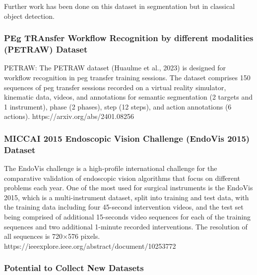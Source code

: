 Further work has been done on this dataset in segmentation \cite{lou_min-max_2022} but in classical object detection.


\subsubsection{PEg TRAnsfer Workflow Recognition by different modalities (PETRAW) Dataset}

PETRAW: The PETRAW dataset (Huaulme et al., 2023) is designed for workflow recognition in peg transfer training sessions. The dataset comprises 150 sequences of peg transfer sessions recorded on a virtual reality simulator, kinematic data, videos, and annotations for semantic segmentation (2 targets and 1 instrument), phase (2 phases), step (12 steps), and action annotations (6 actions). https://arxiv.org/abs/2401.08256

\subsubsection{MICCAI 2015 Endoscopic Vision Challenge (EndoVis 2015) Dataset}

The EndoVis challenge is a high-profile international challenge for the comparative validation of endoscopic vision algorithms that focus on different problems each year. One of the most used for surgical instruments is the EndoVis 2015, which is a multi-instrument dataset, split into training and test data, with the training data including four 45-second intervention videos, and the test set being comprised of additional 15-seconds video sequences for each of the training sequences and two additional 1-minute recorded interventions. The resolution of all sequences is 720×576 pixels. https://ieeexplore.ieee.org/abstract/document/10253772

\subsubsection{Potential to Collect New Datasets}




